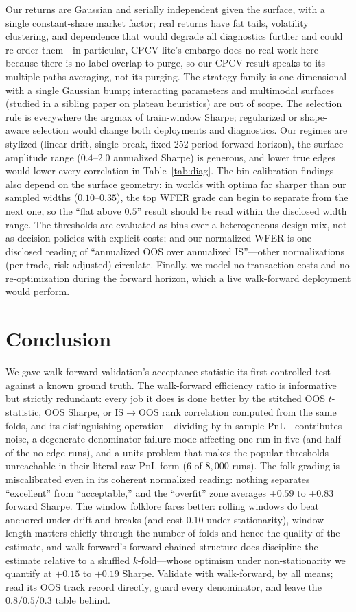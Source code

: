 \documentclass[11pt]{article}
\begin{document}
Our returns are Gaussian and serially independent given the surface, with a
single constant-share market factor; real returns have fat tails, volatility
clustering, and dependence that would degrade all diagnostics further and
could re-order them---in particular, CPCV-lite's embargo does no real work
here because there is no label overlap to purge, so our CPCV result speaks
to its multiple-paths averaging, not its purging. The strategy family is
one-dimensional with a single Gaussian bump; interacting parameters and
multimodal surfaces (studied in a sibling paper on plateau heuristics) are
out of scope. The selection rule is everywhere the argmax of train-window
Sharpe; regularized or shape-aware selection would change both deployments
and diagnostics. Our regimes are stylized (linear drift, single break, fixed
$252$-period forward horizon), the surface amplitude range
($0.4$--$2.0$ annualized Sharpe) is generous, and lower true edges would
lower every correlation in Table~\ref{tab:diag}. The bin-calibration
findings also depend on the surface geometry: in worlds with optima far
sharper than our sampled widths ($0.10$--$0.35$), the top WFER grade can
begin to separate from the next one, so the ``flat above $0.5$'' result
should be read within the disclosed width range. The thresholds are
evaluated as bins over a heterogeneous design mix, not as decision policies
with explicit costs; and our normalized WFER is one disclosed reading of
``annualized OOS over annualized IS''---other normalizations (per-trade,
risk-adjusted) circulate. Finally, we model no transaction costs and no
re-optimization during the forward horizon, which a live walk-forward
deployment would perform.

\section{Conclusion}

We gave walk-forward validation's acceptance statistic its first controlled
test against a known ground truth. The walk-forward efficiency ratio is
informative but strictly redundant: every job it does is done better by the
stitched OOS $t$-statistic, OOS Sharpe, or IS$\to$OOS rank correlation
computed from the same folds, and its distinguishing operation---dividing by
in-sample PnL---contributes noise, a degenerate-denominator failure mode
affecting one run in five (and half of the no-edge runs), and a units problem
that makes the popular thresholds unreachable in their literal raw-PnL form
($6$ of $8{,}000$ runs). The folk grading is miscalibrated even in its
coherent normalized reading: nothing separates ``excellent'' from
``acceptable,'' and the ``overfit'' zone averages $+0.59$ to $+0.83$ forward
Sharpe. The window folklore fares better: rolling windows do beat anchored
under drift and breaks (and cost $0.10$ under stationarity), window length
matters chiefly through the number of folds and hence the quality of the
estimate, and walk-forward's forward-chained structure does discipline the
estimate relative to a shuffled $k$-fold---whose optimism under
non-stationarity we quantify at $+0.15$ to $+0.19$ Sharpe. Validate with
walk-forward, by all means; read its OOS track record directly, guard every
denominator, and leave the $0.8/0.5/0.3$ table behind.
\end{document}
